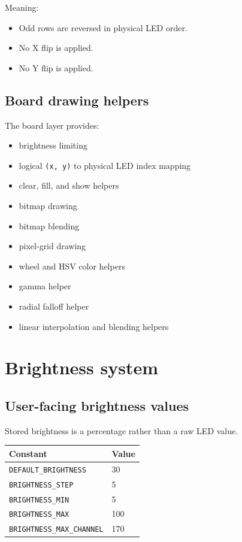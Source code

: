 \documentclass[11pt]{article}
\begin{document}
Meaning:
\begin{itemize}
  \item Odd rows are reversed in physical LED order.
  \item No X flip is applied.
  \item No Y flip is applied.
\end{itemize}

\subsection{Board drawing helpers}
The board layer provides:
\begin{itemize}
  \item brightness limiting
  \item logical \texttt{(x, y)} to physical LED index mapping
  \item clear, fill, and show helpers
  \item bitmap drawing
  \item bitmap blending
  \item pixel-grid drawing
  \item wheel and HSV color helpers
  \item gamma helper
  \item radial falloff helper
  \item linear interpolation and blending helpers
\end{itemize}

\section{Brightness system}
\subsection{User-facing brightness values}
Stored brightness is a percentage rather than a raw LED value.

\begin{center}
\begin{tabular}{ll}
\toprule
Constant & Value \\
\midrule
\texttt{DEFAULT\_BRIGHTNESS} & 30 \\
\texttt{BRIGHTNESS\_STEP} & 5 \\
\texttt{BRIGHTNESS\_MIN} & 5 \\
\texttt{BRIGHTNESS\_MAX} & 100 \\
\texttt{BRIGHTNESS\_MAX\_CHANNEL} & 170 \\
\bottomrule
\end{tabular}
\end{center}
\end{document}
